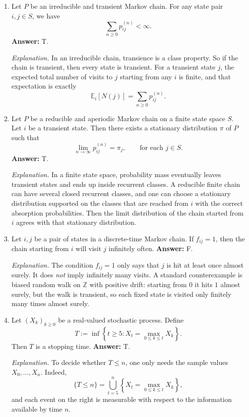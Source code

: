\documentclass[11pt]{article}
\theoremstyle{definition}
\begin{document}
\begin{enumerate}[label=(\arabic*)]
    \item Let $P$ be an irreducible and transient Markov chain. For any state pair $i,j\in S$, we have
    \[
    \sum_{n\ge 0} p_{ij}^{(n)}<\infty.
    \]
    \textbf{Answer:} T.

    \emph{Explanation.} In an irreducible chain, transience is a class property. So if the chain is transient, then every state is transient. For a transient state $j$, the expected total number of visits to $j$ starting from any $i$ is finite, and that expectation is exactly
    \[
    \mathbb E_i[N(j)] = \sum_{n\ge 0} p_{ij}^{(n)}.
    \]

    \item Let $P$ be a reducible and aperiodic Markov chain on a finite state space $S$. Let $i$ be a transient state. Then there exists a stationary distribution $\pi$ of $P$ such that
    \[
    \lim_{n\to\infty} p_{ij}^{(n)} = \pi_j, \qquad \text{for each } j\in S.
    \]
    \textbf{Answer:} T.

    \emph{Explanation.} In a finite state space, probability mass eventually leaves transient states and ends up inside recurrent classes. A reducible finite chain can have several closed recurrent classes, and one can choose a stationary distribution supported on the classes that are reached from $i$ with the correct absorption probabilities. Then the limit distribution of the chain started from $i$ agrees with that stationary distribution.

    \item Let $i,j$ be a pair of states in a discrete-time Markov chain. If $f_{ij}=1$, then the chain starting from $i$ will visit $j$ infinitely often.
    \textbf{Answer:} F.

    \emph{Explanation.} The condition $f_{ij}=1$ only says that $j$ is hit at least once almost surely. It does \emph{not} imply infinitely many visits. A standard counterexample is biased random walk on $\mathbb Z$ with positive drift: starting from $0$ it hits $1$ almost surely, but the walk is transient, so each fixed state is visited only finitely many times almost surely.

    \item Let $(X_k)_{k\ge 0}$ be a real-valued stochastic process. Define
    \[
    T:=\inf\left\{t\ge 5: X_t = \max_{0\le k\le t} X_k\right\}.
    \]
    Then $T$ is a stopping time.
    \textbf{Answer:} T.

    \emph{Explanation.} To decide whether $T\le n$, one only needs the sample values $X_0,\dots,X_n$. Indeed,
    \[
    \{T\le n\}
    =
    \bigcup_{t=5}^n \left\{X_t = \max_{0\le k\le t} X_k\right\},
    \]
    and each event on the right is measurable with respect to the information available by time $n$.


\end{enumerate}
\end{document}
